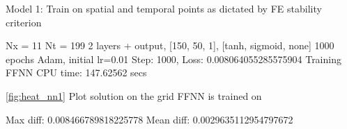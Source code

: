 Model 1: Train on spatial and temporal points as dictated by FE stability criterion

Nx = 11
Nt = 199
2 layers + output, [150, 50, 1], [tanh, sigmoid, none] 
1000 epochs
Adam, initial lr=0.01
Step: 1000, Loss: 0.008064055285575904
Training FFNN CPU time: 147.62562 secs

\autoref{fig:heat_nn1} Plot solution on the grid FFNN is trained on

Max diff: 0.008466789818225778
Mean diff: 0.0029635112954797672

\begin{figure}[H]
\centering
{}
\qquad
{}

\end{figure}
